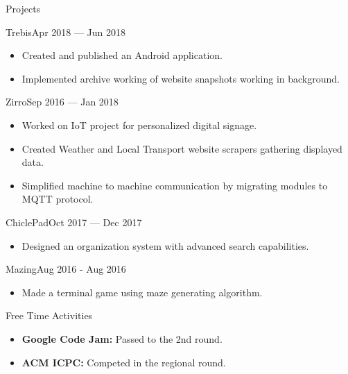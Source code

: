 \documentclass[]{style}
\begin{document}
	\begin{cvsection}{Projects}
	    \begin{cvsubsection}{Trebis}{}{Apr 2018 — Jun 2018}
			\begin{itemize}
				\item Created and published an Android application.
				\item Implemented archive working of website snapshots working in background.
			\end{itemize}
		\end{cvsubsection}
		
		\begin{cvsubsection}{Zirro}{}{Sep 2016 — Jan 2018}
			\begin{itemize}
			    \item Worked on IoT project for personalized digital signage.
				\item Created Weather and Local Transport website scrapers gathering displayed data.
				\item Simplified machine to machine communication by migrating modules to MQTT protocol.
			\end{itemize}
		\end{cvsubsection}
		
	    \begin{cvsubsection}{ChiclePad}{}{Oct 2017 — Dec 2017}
			\begin{itemize}
				\item Designed an organization system with advanced search capabilities.
			\end{itemize}
		\end{cvsubsection}

		\begin{cvsubsection}{Mazing}{}{Aug 2016 - Aug 2016}
			\begin{itemize}
				\item Made a terminal game using maze generating algorithm. 
			\end{itemize}
		\end{cvsubsection}
	\end{cvsection}
	
	\begin{cvsection}{Free Time Activities}
		\begin{cvsubsection}{}{}{}	
			\begin{itemize}
				\item \textbf{Google Code Jam:} Passed to the 2nd round.
                \item \textbf{ACM ICPC:} Competed in the regional round.
			\end{itemize}
		\end{cvsubsection}
	\end{cvsection}
	
\end{document}
